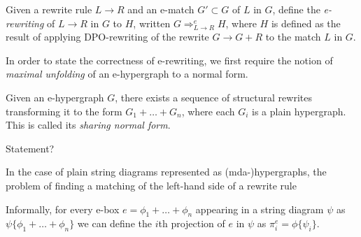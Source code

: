 \begin{definition}[E-rewriting]

Given a rewrite rule $L \to R$ and an e-match $G' \subset G$ of $L$ in $G$, define the \textit{e-rewriting} of $L \to R$ in $G$ to $H$, written $G \Rightarrow_{L \to R}^e H$, where $H$ is defined as the result of applying DPO-rewriting of the rewrite $G \to G+R$ to the match $L$ in $G$. 
\end{definition}

In order to state the correctness of e-rewriting, we first require the notion of \textit{maximal unfolding} of an e-hypergraph to a normal form. 
\begin{definition}
Given an e-hypergraph $G$, there exists a sequence of structural rewrites transforming it to the form $G_1 + \ldots + G_n$, where each $G_i$ is a plain hypergraph. This is called its \textit{sharing normal form}.
\end{definition}


\begin{lemma}
Statement?
\end{lemma}

In the case of plain string diagrams represented as (mda-)hypergraphs, the problem of finding a matching of the left-hand side of a rewrite rule %


Informally, for every e-box $e = \phi_1 + \ldots + \phi_n$ appearing in a string diagram $\psi$ as $\psi\{\phi_1 + \ldots + \phi_n\}$ we can define the $i$th projection of $e$ in $\psi$ as $\pi^e_i = \phi\{\psi_i\}$. 